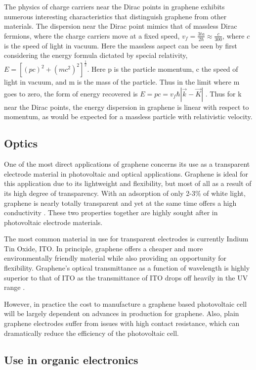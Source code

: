 The physics of charge carriers near the Dirac points in graphene exhibits numerous interesting characteristics that distinguish graphene from other materials. The dispersion near the Dirac point mimics that of massless Dirac fermions, where the charge carriers move at a fixed speed, $v_f  = \frac{3ta}{2\hbar}\approx \frac{c}{300}$, where $c$ is the speed of light in vacuum. Here the massless aspect can be seen by first considering the energy formula dictated by special relativity, $ E = [(pc)^2 + (mc^2)^2]^\frac{1}{2}$.  Here p is the particle momentum, c the speed of light in vacuum, and m is the mass of the particle. Thus in the limit where m goes to zero, the form of energy recovered is $E = pc = v_f \hbar | \vec{k}-\vec{K}|$ \cite{Wolf}. Thus for k near the Dirac points, the energy dispersion in graphene is linear with respect to momentum, as would be expected for a massless particle with relativistic velocity.



  \subsection{Optics}
  One of the most direct applications of graphene concerns its use as a transparent electrode material in photovoltaic and optical applications. Graphene is ideal for this application due to its lightweight and flexibility, but most of all as a result of its high degree of transparency. With an adsorption of only 2-3\% of white light, graphene is nearly totally transparent and yet at the same time offers a high conductivity \cite{graphene-optics}. These two properties together are highly sought after in photovoltaic electrode materials.

The most common material in use for transparent electrodes is currently Indium Tin Oxide, ITO. In principle, graphene offers a cheaper and more environmentally friendly material while also providing an opportunity for flexibility. Graphene's optical transmittance as a function of wavelength is highly superior to that of ITO as the transmittance of ITO drops off heavily in the UV range \cite{ graphene-synth-app, graphene-opto}.

However, in practice the cost to manufacture a graphene based photovoltaic cell will be largely dependent on advances in production for graphene. Also, plain graphene electrodes suffer from issues with high contact resistance, which can dramatically reduce the efficiency of the photovoltaic cell.

 \subsection{Use in organic electronics}

